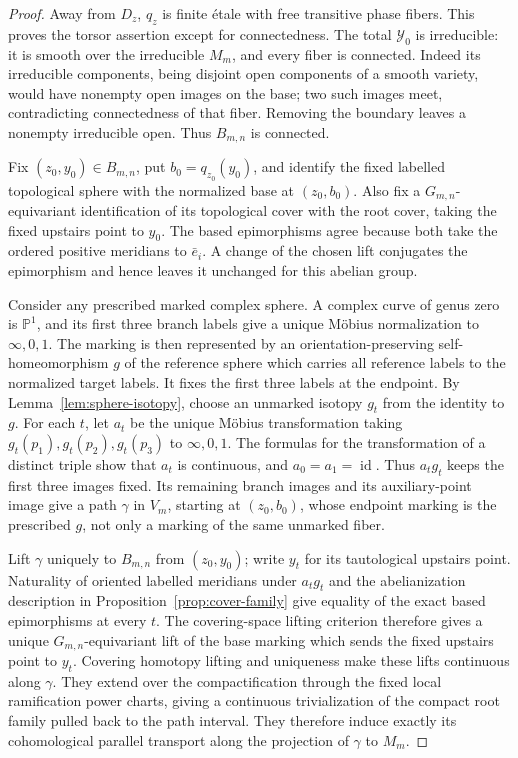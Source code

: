 \documentclass[11pt]{article}
\newcommand{\PP}{\mathbb P}
\newcommand{\id}{\operatorname{id}}
\newcommand{\cY}{\mathcal Y}
\theoremstyle{plain}
\theoremstyle{definition}
\theoremstyle{remark}
\numberwithin{equation}{section}
\begin{document}
\begin{proof}
Away from \(D_z\), \(q_z\) is finite \'{e}tale with
free transitive phase fibers.  This proves the torsor assertion
except for connectedness.  The total \(\cY_0\) is irreducible:
it is smooth over the irreducible \(M_m\), and every fiber is
connected.  Indeed its irreducible components, being disjoint
open components of a smooth variety, would have nonempty open
images on the base; two such images meet, contradicting
connectedness of that fiber.  Removing the boundary leaves a
nonempty irreducible open.  Thus \(B_{m,n}\) is connected.

Fix \((z_0,y_0)\in B_{m,n}\), put \(b_0=q_{z_0}(y_0)\), and
identify the fixed labelled topological sphere with the normalized
base at \((z_0,b_0)\).  Also fix a \(G_{m,n}\)-equivariant
identification of its topological cover with the root cover,
taking the fixed upstairs point to \(y_0\).  The based
epimorphisms agree because both take the ordered positive meridians
to \(\bar e_i\).  A change of the chosen lift conjugates the
epimorphism and hence leaves it unchanged for this abelian group.

Consider any prescribed marked complex sphere.  A complex curve
of genus zero is \(\PP^1\), and its first three branch labels
give a unique M\"obius normalization to \(\infty,0,1\).
The marking is then represented by an orientation-preserving
self-homeomorphism \(g\) of the reference sphere which carries
all reference labels to the normalized target labels.  It fixes
the first three labels at the endpoint.  By
Lemma~\ref{lem:sphere-isotopy}, choose an unmarked isotopy \(g_t\)
from the identity to \(g\).  For each \(t\), let \(a_t\) be the
unique M\"obius transformation taking
\(g_t(p_1),g_t(p_2),g_t(p_3)\) to \(\infty,0,1\).
The formulas for the transformation of a distinct triple show
that \(a_t\) is continuous, and \(a_0=a_1=\id\).
Thus \(a_tg_t\) keeps the first three images fixed.  Its remaining
branch images and its auxiliary-point image give a path
\(\gamma\) in \(V_m\), starting at \((z_0,b_0)\), whose endpoint
marking is the prescribed \(g\), not only a marking of the same
unmarked fiber.

Lift \(\gamma\) uniquely to \(B_{m,n}\) from \((z_0,y_0)\);
write \(y_t\) for its tautological upstairs point.  Naturality
of oriented labelled meridians under \(a_tg_t\) and the
abelianization description in Proposition~\ref{prop:cover-family}
give equality of the exact based epimorphisms at every \(t\).
The covering-space lifting criterion therefore gives a unique
\(G_{m,n}\)-equivariant lift of the base marking which sends
the fixed upstairs point to \(y_t\).  Covering homotopy lifting
and uniqueness make these lifts continuous along \(\gamma\).
They extend over the compactification through the fixed local
ramification power charts, giving a continuous trivialization of
the compact root family pulled back to the path interval.
They therefore induce exactly its cohomological parallel transport
along the projection of \(\gamma\) to \(M_m\).


\end{proof}
\end{document}
